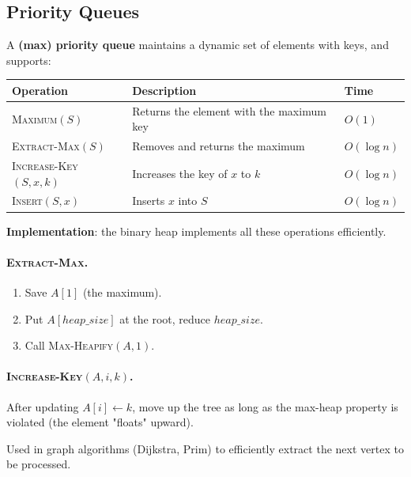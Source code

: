 \subsection{Priority Queues}

A \textbf{(max) priority queue} maintains a dynamic set of elements with keys,
and supports:

\begin{center}
\renewcommand{\arraystretch}{1.3}
\begin{tabular}{lll}
\toprule
\textbf{Operation} & \textbf{Description} & \textbf{Time} \\
\midrule
\textsc{Maximum}$(S)$       & Returns the element with the maximum key & $O(1)$ \\
\textsc{Extract-Max}$(S)$   & Removes and returns the maximum      & $O(\log n)$ \\
\textsc{Increase-Key}$(S,x,k)$ & Increases the key of $x$ to $k$   & $O(\log n)$ \\
\textsc{Insert}$(S,x)$      & Inserts $x$ into $S$                 & $O(\log n)$ \\
\bottomrule
\end{tabular}
\end{center}

\textbf{Implementation}: the binary heap implements all these operations efficiently.

\paragraph{\textsc{Extract-Max}.}
\begin{enumerate}[noitemsep]
  \item Save $A[1]$ (the maximum).
  \item Put $A[heap\_size]$ at the root, reduce $heap\_size$.
  \item Call \textsc{Max-Heapify}$(A,1)$.
\end{enumerate}

\paragraph{\textsc{Increase-Key}$(A, i, k)$.}
After updating $A[i] \leftarrow k$, move up the tree as long as the max-heap 
property is violated (the element "floats" upward).

\begin{tcolorbox}[colback=lightblue, colframe=keyblue, fonttitle=\bfseries,
                  title={Application: Priority Queue}]
Used in graph algorithms (Dijkstra, Prim) to efficiently extract the next 
vertex to be processed.
\end{tcolorbox}